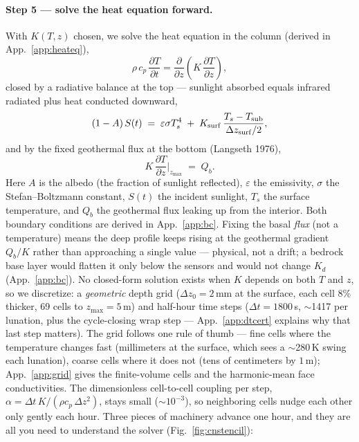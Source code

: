 \documentclass[11pt]{report}
\begin{document}
\paragraph{\textbf{Step 5 --- solve the heat equation forward.}}
With $K(T,z)$ chosen, we solve the heat equation in the column (derived in
App.~\ref{app:heateq}),
\begin{equation}
\rho\,c_p\,\frac{\partial T}{\partial t}
=\frac{\partial}{\partial z}\!\left(K\,\frac{\partial T}{\partial z}\right),
\label{eq:heat}
\end{equation}
closed by a radiative balance at the top --- sunlight absorbed equals infrared
radiated plus heat conducted downward,
\begin{equation}
(1-A)\,S(t) \;=\; \varepsilon\sigma T_s^4 \;+\; K_{\rm surf}\,\frac{T_s-T_{\rm sub}}{\Delta z_{\rm surf}/2},
\label{eq:surfbc}
\end{equation}
and by the fixed geothermal flux at the bottom (Langseth 1976),
\begin{equation}
K\,\frac{\partial T}{\partial z}\bigg|_{z_{\max}} \;=\; Q_b.
\label{eq:bottombc}
\end{equation}
Here $A$ is the albedo (the fraction of sunlight reflected), $\varepsilon$ the emissivity,
$\sigma$ the Stefan--Boltzmann constant, $S(t)$ the incident sunlight, $T_s$ the surface
temperature, and $Q_b$ the geothermal flux leaking up from the interior.
Both boundary conditions are derived in App.~\ref{app:bc}. Fixing the basal
\emph{flux} (not a temperature) means the deep profile keeps rising at the
geothermal gradient $Q_b/K$ rather than approaching a single value --- physical,
not a drift; a bedrock base layer would flatten it only below the sensors and
would not change $K_d$ (App.~\ref{app:bc}). No closed-form solution exists when
$K$ depends on both $T$ and $z$, so we discretize: a
\emph{geometric} depth grid ($\Delta z_0=2$\,mm at the surface, each cell 8\%
thicker, 69 cells to $z_{\max}=5$\,m) and half-hour time steps
($\Delta t=1800$\,s, $\sim$1417 per lunation, plus the cycle-closing wrap
step --- App.~\ref{app:dtcert} explains why that last step matters). The grid follows one rule of thumb --- fine cells where
the temperature changes fast (millimeters at the surface, which sees a
$\sim$280\,K swing each lunation), coarse cells where it does not (tens of
centimeters by $1$\,m); App.~\ref{app:grid} gives the finite-volume cells and the
harmonic-mean face conductivities. The dimensionless cell-to-cell coupling per step,
$\alpha=\Delta t\,K/(\rho c_p\,\Delta z^2)$, stays small ($\sim10^{-3}$), so
neighboring cells nudge each other only gently each hour. Three pieces of
machinery advance one hour, and they are all you need to understand the solver
(Fig.~\ref{fig:cnstencil}):
\end{document}
